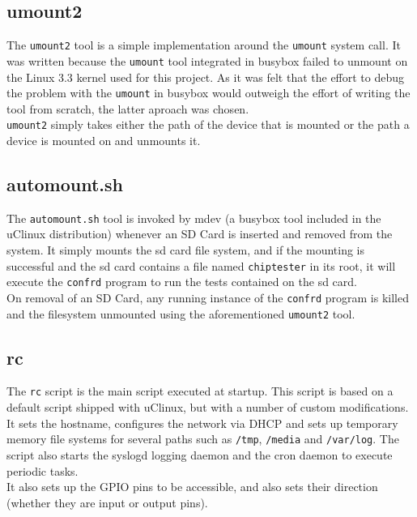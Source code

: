 \subsection{umount2}
The \texttt{umount2} tool is a simple implementation around the \texttt{umount} system call.
It was written because the \texttt{umount} tool integrated in busybox failed to unmount
on the Linux 3.3 kernel used for this project. As it was felt that the effort to debug
the problem with the \texttt{umount} in busybox would outweigh the effort of writing the tool
from scratch, the latter aproach was chosen.
\\

\texttt{umount2} simply takes either the path of the device that is mounted or the path
a device is mounted on and unmounts it.


\subsection{automount.sh}
The \texttt{automount.sh} tool is invoked by mdev (a busybox tool included in the uClinux
distribution) whenever an SD Card is inserted and removed
from the system. It simply mounts the sd card file system, and if the mounting is
successful and the sd card contains a file named \texttt{chiptester} in its root, it
will execute the \texttt{confrd} program to run the tests contained on the sd card.
\\

On removal of an SD Card, any running instance of the \texttt{confrd} program is killed
and the filesystem unmounted using the aforementioned \texttt{umount2} tool.


\subsection{rc}
The \texttt{rc} script is the main script executed at startup. This script is based
on a default script shipped with uClinux, but with a number of custom modifications.
\\
 
It sets the hostname, configures the network via DHCP and sets up temporary memory file
systems for several paths such as \texttt{/tmp}, \texttt{/media} and \texttt{/var/log}. The
script also starts the syslogd logging daemon and the cron daemon to execute periodic tasks.
\\

It also sets up the GPIO pins to be accessible, and also sets their direction (whether
they are input or output pins).
\\

